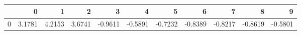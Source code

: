 \begin{tabular}{lrrrrrrrrrr}
\toprule
{} &       0 &       1 &       2 &       3 &       4 &       5 &       6 &       7 &       8 &       9 \\
\midrule
0 &  3.1781 &  4.2153 &  3.6741 & -0.9611 & -0.5891 & -0.7232 & -0.8389 & -0.8217 & -0.8619 & -0.5801 \\
\bottomrule
\end{tabular}
